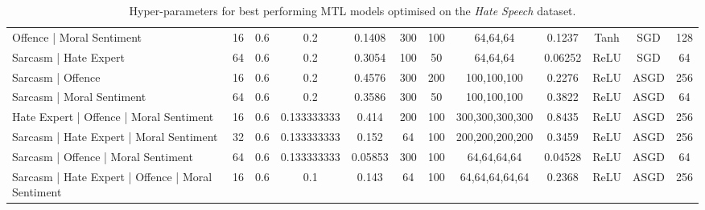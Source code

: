 {\begin{landscape}
\begin{table}[]
{\begin{tabular}{l|ccccccccccc}
      Offence | Moral Sentiment                         & 16         & 0.6              & 0.2              & 0.1408  & 300           & 100    & 64,64,64        & 0.1237        & Tanh          & SGD       & 128        \\
      Sarcasm | Hate Expert                             & 64         & 0.6              & 0.2              & 0.3054  & 100           & 50     & 64,64,64        & 0.06252       & ReLU          & SGD       & 64         \\
      Sarcasm | Offence                                 & 16         & 0.6              & 0.2              & 0.4576  & 300           & 200    & 100,100,100     & 0.2276        & ReLU          & ASGD      & 256        \\
      Sarcasm | Moral Sentiment                         & 64         & 0.6              & 0.2              & 0.3586  & 300           & 50     & 100,100,100     & 0.3822        & ReLU          & ASGD      & 64         \\
      Hate Expert  | Offence | Moral Sentiment          & 16         & 0.6              & 0.133333333      & 0.414   & 200           & 100    & 300,300,300,300 & 0.8435        & ReLU          & ASGD      & 256        \\
      Sarcasm | Hate Expert | Moral Sentiment           & 32         & 0.6              & 0.133333333      & 0.152   & 64            & 100    & 200,200,200,200 & 0.3459        & ReLU          & ASGD      & 256        \\
      Sarcasm | Offence | Moral Sentiment               & 64         & 0.6              & 0.133333333      & 0.05853 & 300           & 100    & 64,64,64,64     & 0.04528       & ReLU          & ASGD      & 64         \\
      Sarcasm | Hate Expert | Offence | Moral Sentiment & 16         & 0.6              & 0.1              & 0.143   & 64            & 100    & 64,64,64,64,64  & 0.2368        & ReLU          & ASGD      & 256
    \end{tabular}%
    }
    \caption{Hyper-parameters for best performing MTL models optimised on the \textit{Hate Speech} dataset.}
    \label{tab:mtl_params_wh}
  \end{table}
  \vfill
  \begin{table}[]
    \centering
\end{table}
\end{landscape}}
